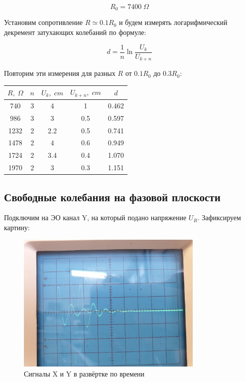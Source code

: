 \documentclass{article}
\begin{document}
\[ R_0 = 7400\; \Omega \]

Установим сопротивление \( R \simeq 0.1R_0 \) и будем измерять логарифмический декремент затухающих колебаний
по формуле:

\[ d = \frac{1}{n}\ln \frac{U_k}{U_{k+n}} \]

Повторим эти измерения для разных \( R \) от \( 0.1R_0 \) до \( 0.3R_0 \):

\begin{table}[H]
    \centering
    \begin{tabular}{|c|c|c|c|c|}
    \hline
    \(R,\; \Omega\) & \(n\) & \(U_k,\; cm \)& \(U_{k+n},\; cm\) & \(d\) \\\hline
    740   & 3 & 4    & 1          & 0.462 \\\hline
    986   & 3 & 3    & 0.5        & 0.597 \\\hline
    1232  & 2 & 2.2  & 0.5        & 0.741 \\\hline
    1478  & 2 & 4    & 0.6        & 0.949 \\\hline
    1724  & 2 & 3.4  & 0.4        & 1.070 \\\hline
    1970  & 2 & 3    & 0.3        & 1.151 \\\hline
    \end{tabular}
\end{table}

\subsection{Свободные колебания на фазовой плоскости}
Подключим на ЭО канал Y, на который подано напряжение \( U_R \). Зафиксируем картину:

\begin{figure}[H]
    \centering
    \includegraphics[width = 0.8\textwidth]{X_and_Y_time.jpg}
    \caption{Сигналы X и Y в развёртке по времени}
    \label{fig:XY_time}
\end{figure}
\end{document}
